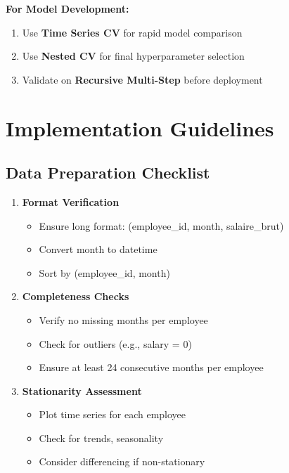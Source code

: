 \documentclass[12pt,a4paper]{article}
\begin{document}
\textbf{For Model Development:}
\begin{enumerate}
    \item Use \textbf{Time Series CV} for rapid model comparison
    \item Use \textbf{Nested CV} for final hyperparameter selection
    \item Validate on \textbf{Recursive Multi-Step} before deployment
\end{enumerate}

\section{Implementation Guidelines}

\subsection{Data Preparation Checklist}

\begin{enumerate}
    \item \textbf{Format Verification}
    \begin{itemize}
        \item Ensure long format: (employee\_id, month, salaire\_brut)
        \item Convert month to datetime
        \item Sort by (employee\_id, month)
    \end{itemize}
    
    \item \textbf{Completeness Checks}
    \begin{itemize}
        \item Verify no missing months per employee
        \item Check for outliers (e.g., salary = 0)
        \item Ensure at least 24 consecutive months per employee
    \end{itemize}
    
    \item \textbf{Stationarity Assessment}
    \begin{itemize}
        \item Plot time series for each employee
        \item Check for trends, seasonality
        \item Consider differencing if non-stationary
    \end{itemize}
\end{enumerate}
\end{document}
